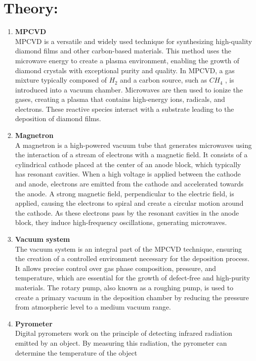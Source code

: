 \documentclass[]{report}[12 pt]
\begin{document}
	\section*{Theory:}
	\begin{enumerate}
		\item  \textbf{MPCVD}\\
		MPCVD is a versatile and widely used technique for synthesizing high-quality diamond
		films and other carbon-based materials. This method uses the microwave energy to create a
		plasma environment, enabling the growth of diamond crystals with exceptional purity and
		quality. In MPCVD, a gas mixture typically composed of $H_2$ and a carbon source, such as
		$CH_4$ , is introduced into a vacuum chamber. Microwaves are then used to ionize the gases,
		creating a plasma that contains high-energy ions, radicals, and electrons. These reactive
		species interact with a substrate leading to the deposition of diamond films.
		\item \textbf{Magnetron}\\
		A magnetron is a high-powered vacuum tube that generates microwaves using the interaction
		of a stream of electrons with a magnetic field. It consists of a cylindrical cathode placed at
		the center of an anode block, which typically has resonant cavities. When a high voltage is
		applied between the cathode and anode, electrons are emitted from the cathode and
		accelerated towards the anode. A strong magnetic field, perpendicular to the electric field, is
		applied, causing the electrons to spiral and create a circular motion around the cathode. As
		these electrons pass by the resonant cavities in the anode block, they induce high-frequency
		oscillations, generating microwaves.
		\item \textbf{Vacuum system}\\
		The vacuum system is an integral part of the MPCVD technique, ensuring the creation of a controlled environment necessary for the deposition process. It allows precise control over gas phase composition, pressure, and temperature, which are essential for the growth of defect-free and high-purity materials. The rotary pump, also known as a roughing pump, is used to create a primary vacuum in the deposition chamber by reducing the pressure from
		atmospheric level to a medium vacuum range.
		\item \textbf{Pyrometer}\\
		Digital pyrometers work on the principle of detecting infrared radiation emitted by an object.
		By measuring this radiation, the pyrometer can determine the temperature of the object

\end{enumerate}
\end{document}
